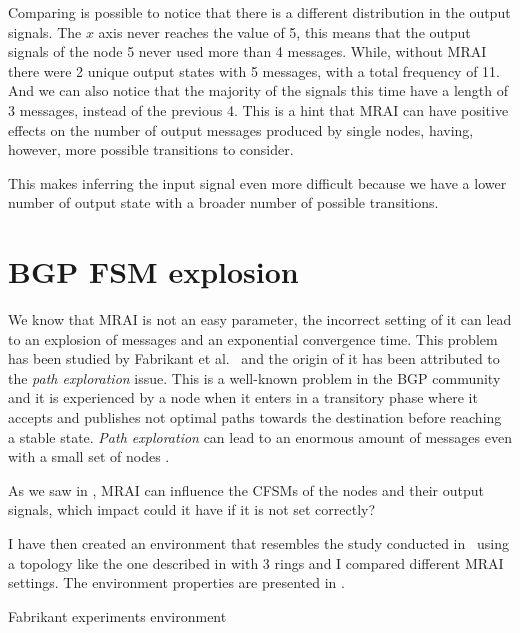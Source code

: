 Comparing  is possible to notice
that there is a different distribution in the output signals.
The $x$ axis never reaches the value of \num{5}, this means that the output signals
of the node \num{5} never used more than \num{4} messages.
While, without \ac{MRAI} there were \num{2} unique output states with \num{5}
messages, with a total frequency of \num{11}.
And we can also notice that the majority of the signals this time have a length
of \num{3} messages, instead of the previous \num{4}.
This is a hint that \ac{MRAI} can have positive effects on the number of output messages
produced by single nodes, having, however, more possible transitions to consider.

This makes inferring the input signal even more difficult because we have a lower
number of output state with a broader number of possible transitions.

\section{BGP FSM explosion}
\label{sec:bgp_fsm_explosion}

We know that \ac{MRAI} is not an easy parameter, the incorrect setting of
it can lead to an explosion of messages and an exponential convergence time.
This problem has been studied by Fabrikant et al.~\cite{fabrikant2011there} and
the origin of it has been attributed to the \textit{path exploration} issue.
This is a well-known problem in the \ac{BGP} community and it is experienced
by a node when it enters in a transitory phase where it accepts and publishes not
optimal paths towards the destination before reaching a stable state.
\textit{Path exploration} can lead to an enormous amount of messages even with
a small set of nodes \cite{deshpande2004impact}.

As we saw in , \ac{MRAI} can influence the
\ac{CFSM}s of the nodes and their output signals, which impact could it have
if it is not set correctly?

I have then created an environment that resembles the study conducted in~\cite{fabrikant2011there}
using a topology like the one described in 
with \num{3} rings and I compared different \ac{MRAI} settings.
The environment properties are presented in .

\begin{table}[h]
	
	\caption{Fabrikant experiments environment}
	\label{tbl:fabrikant_environment}
\end{table}

